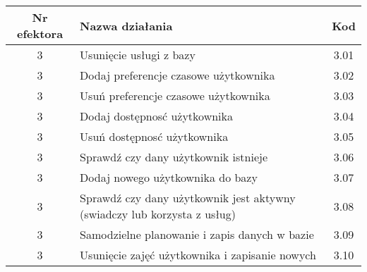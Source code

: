 \begin{tabular}{c|p{5cm}|c}
Nr efektora & Nazwa działania & Kod\\
\hline
3 & Usunięcie usługi z bazy & 3.01\\
3 & Dodaj preferencje czasowe użytkownika & 3.02\\
3 & Usuń preferencje czasowe użytkownika & 3.03\\
3 & Dodaj dostępnosć użytkownika & 3.04\\
3 & Usuń dostępnosć użytkownika & 3.05\\
3 & Sprawdź czy dany użytkownik istnieje & 3.06\\
3 & Dodaj nowego użytkownika do bazy & 3.07\\
3 & Sprawdź czy dany użytkownik jest aktywny (swiadczy lub korzysta z usług) & 3.08\\
3 & Samodzielne planowanie i zapis danych w bazie & 3.09\\
3 & Usunięcie zajęć użytkownika i zapisanie nowych & 3.10\\
\end{tabular}



